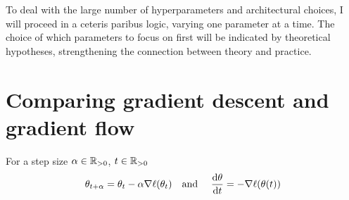 \documentclass[reqno]{amsart}
\begin{document}
To deal with the large number of hyperparameters and architectural choices, I will proceed in a ceteris paribus logic, varying one parameter at a time. The choice of which parameters to focus on first will be indicated by theoretical hypotheses, strengthening the connection between theory and practice.





\newpage
\appendix
\section{Comparing gradient descent and gradient flow}
\begin{proposition}\label{app}
For a step size $\alpha\in\mathbb{R}_{>0}$, $t\in \mathbb{R}_{>0}$
\[
\theta_{t+\alpha}=\theta_t - \alpha \nabla\ell(\theta_t)\quad \text{and }\quad \frac{\mathrm{d} \theta}{\mathop{}\!\mathrm{d} t} = -\nabla\ell(\theta(t))
\]


\end{proposition}
\end{document}
